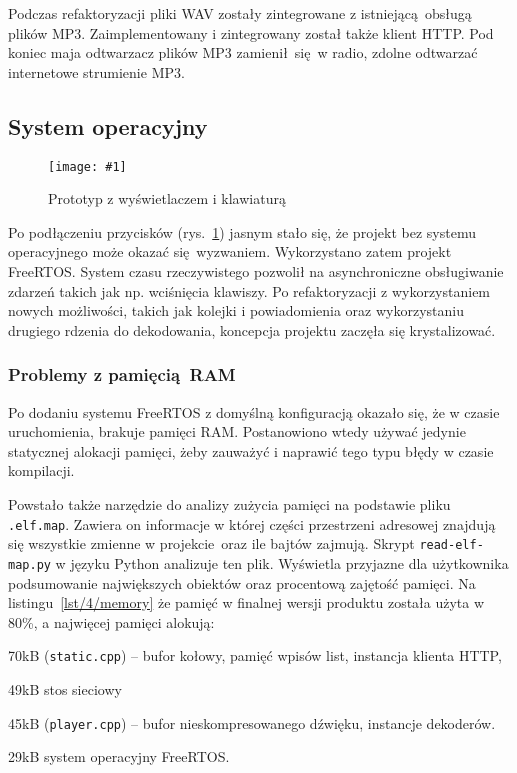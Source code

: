 \documentclass[12pt]{report}
\let\tempone\itemize
\let\temptwo\enditemize
\renewenvironment{itemize}{\tempone\setlength{\itemsep}{0cm}}{\temptwo}
\newcommand{\imgint}[4]{
	\begin{figure}[{#4}]
		\centering
		\texttt{[image: \#1]}
		\caption{#2}
		\label{#1}
	\end{figure}
}
\newcommand{\imgh}[3]{\imgint{#1}{#2}{#3}{H}}
\newcommand{\lstfile}[3]{
	\noindent
	\hspace{0.1\linewidth}
	\begin{minipage}{0.8\linewidth}
		
	\end{minipage}
	\vspace{0.3cm}
}
\begin{document}
			Podczas refaktoryzacji pliki WAV zostały zintegrowane z istniejącą obsługą plików MP3. Zaimplementowany i zintegrowany został także klient HTTP. Pod koniec maja odtwarzacz plików MP3 zamienił się w radio, zdolne odtwarzać internetowe strumienie MP3.
			
		\subsection{System operacyjny}
			\imgh{4/prototype_2}{Prototyp z wyświetlaczem i klawiaturą}{0.8}
		
			Po podłączeniu przycisków (rys.~\ref{4/prototype_2}) jasnym stało się, że projekt bez systemu operacyjnego może okazać się wyzwaniem. Wykorzystano zatem projekt FreeRTOS. System czasu rzeczywistego pozwolił na asynchroniczne obsługiwanie zdarzeń takich jak np. wciśnięcia klawiszy. Po refaktoryzacji z wykorzystaniem nowych możliwości, takich jak kolejki i powiadomienia oraz wykorzystaniu drugiego rdzenia do dekodowania, koncepcja projektu zaczęła się krystalizować.
			
			\subsubsection{Problemy z pamięcią RAM}
				Po dodaniu systemu FreeRTOS z domyślną konfiguracją okazało się, że w czasie uruchomienia, brakuje pamięci RAM.
				Postanowiono wtedy używać jedynie statycznej alokacji pamięci, żeby zauważyć i naprawić tego typu błędy w czasie kompilacji.

				\lstfile{default}{Zajętość pamięci RAM}{lst/4/memory}

				Powstało także narzędzie do analizy zużycia pamięci na podstawie pliku \lstinline|.elf.map|. Zawiera on informacje w której części przestrzeni adresowej znajdują się wszystkie zmienne w projekcie oraz ile bajtów zajmują. Skrypt \lstinline|read-elf-map.py| w języku Python analizuje ten plik. Wyświetla przyjazne dla użytkownika podsumowanie największych obiektów oraz procentową zajętość pamięci. Na listingu~\ref{lst/4/memory} że pamięć w finalnej wersji produktu została użyta w 80\%, a najwięcej pamięci alokują:
				\begin{itemize}
					\item 70kB (\lstinline|static.cpp|) -- bufor kołowy, pamięć wpisów list, instancja klienta HTTP,
					\item 49kB stos sieciowy
					\item 45kB (\lstinline|player.cpp|) -- bufor nieskompresowanego dźwięku, instancje dekoderów.
					\item 29kB system operacyjny FreeRTOS.
				\end{itemize}
			
\end{document}
